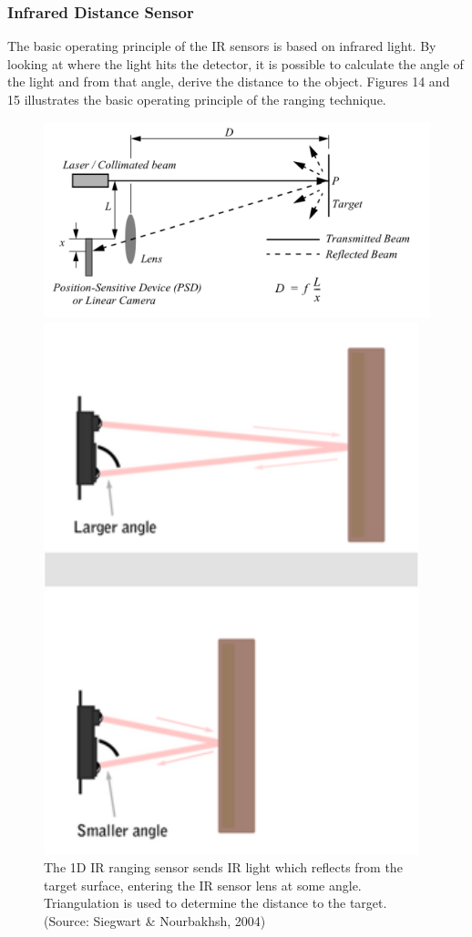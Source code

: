 \documentclass[a4paper]{article}
\begin{document}
\subsubsection{Infrared Distance Sensor}
The basic operating principle of the IR sensors is based on infrared light. By looking at where the light hits the detector, it is possible to calculate the angle of the light and from that angle, derive the distance to the object. Figures 14 and 15 illustrates the basic operating principle of the ranging technique.
\begin{figure}[h]
\centering
\begin{minipage}[t]{0.45\textwidth}
\centering
\includegraphics[scale=0.25]{1d_IR_triang}
\caption{The 1D IR ranging sensor sends IR light which reflects from the target surface, entering the IR sensor lens at some angle. Triangulation is used to determine the distance to the target. (Source: Siegwart \& Nourbakhsh, 2004)}
\end{minipage}
\hspace{1cm}
\begin{minipage}[t]{0.45\textwidth}
\centering
\includegraphics[scale=0.25]{1d_IR_example}

\end{minipage}
\end{figure}
\end{document}
